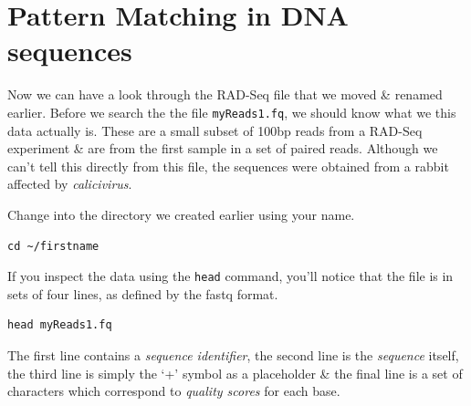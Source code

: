 \documentclass[a4paper,12pt,twoside]{memoir}
\begin{document}
\section{Pattern Matching in DNA sequences}
Now we can have a look through the RAD-Seq file that we moved \& renamed earlier.
Before we search the the file \texttt{myReads1.fq}, we should know what we this data actually is.
These are a small subset of 100bp reads from a RAD-Seq experiment \& are from the first sample in a set of paired reads.
Although we can't tell this directly from this file, the sequences were obtained from a rabbit affected by \textit{calicivirus}.
\begin{steps}
Change into the directory we created earlier using your name.
\begin{lstlisting}
cd ~/firstname
\end{lstlisting}
\end{steps}

\begin{steps}
If you inspect the data using the \texttt{head} command, you'll notice that the file is in sets of four lines, as defined by the fastq format.
\begin{lstlisting}
head myReads1.fq
\end{lstlisting}
The first line contains a \textit{sequence identifier}, the second line is the \textit{sequence} itself, the third line is simply the `+' symbol as a placeholder \& the final line is a set of characters which correspond to \textit{quality scores} for each base.
\end{steps}

\end{document}
